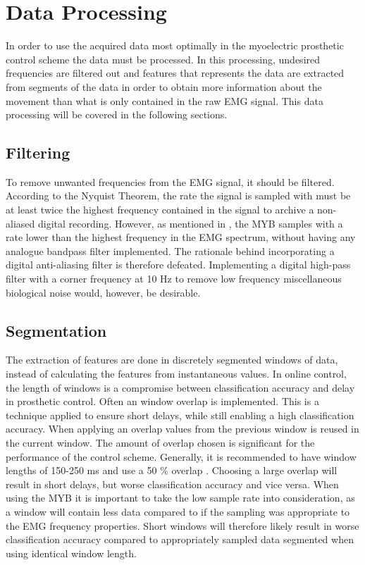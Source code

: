 \section{Data Processing} \label{sec:BG:dataProcessing}
In order to use the acquired data most optimally in the myoelectric prosthetic control scheme the data must be processed. In this processing, undesired frequencies are filtered out and features that represents the data are extracted from segments of the data in order to obtain more information about the movement than what is only contained in the raw EMG signal. This data processing will be covered in the following sections. 

\subsection{Filtering}
To remove unwanted frequencies from the EMG signal, it should be filtered. According to the Nyquist Theorem, the rate the signal is sampled with must be at least twice the highest frequency contained in the signal to archive a non-aliased digital recording. However, as mentioned in , the MYB samples with a rate lower than the highest frequency in the EMG spectrum, without having any analogue bandpass filter implemented. The rationale behind incorporating a digital anti-aliasing filter is therefore defeated. Implementing a digital high-pass filter with a corner frequency at 10 Hz to remove low frequency miscellaneous biological noise would, however, be desirable. \cite{Cram2012} 

\subsection{Segmentation}
The extraction of features are done in discretely segmented windows of data, instead of calculating the features from instantaneous values. In online control, the length of windows is a compromise between classification accuracy and delay in prosthetic control. Often an window overlap is implemented. This is a technique applied to ensure short delays, while still enabling a high classification accuracy. When applying an overlap values from the previous window is reused in the current window. The amount of overlap chosen is significant for the performance of the control scheme.  Generally, it is recommended to have window lengths of 150-250 ms and use a 50 $\percent$ overlap \cite{Menon2017}. Choosing a large overlap will result in short delays, but worse classification accuracy and vice versa. When using the MYB it is important to take the low sample rate into consideration, as a window will contain less data compared to if the sampling was appropriate to the EMG frequency properties. \cite{Menon2017} Short windows will therefore likely result in worse classification accuracy compared to appropriately sampled data segmented when using identical window length.


